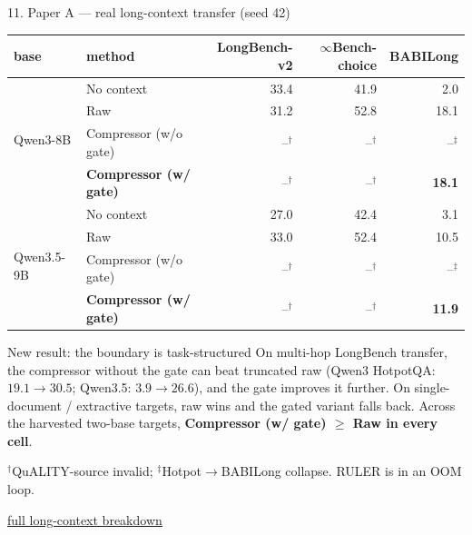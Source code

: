 \documentclass[aspectratio=169]{beamer}
\newcommand{\ghbase}{https://github.com/BDeMo/research-notes/blob/main/notes/plans/08-compressed-context-memory}
\newcommand{\ghA}[2]{\href{\ghbase/papers/paper-a-latent-memory/#1}{\color{blue}\underline{#2}}}
\newcommand{\best}[1]{\textbf{#1}}
\newcommand{\refm}[1]{\textcolor{black!55}{#1}}
\begin{document}
\begin{frame}{11. Paper A --- real long-context transfer (seed 42)}
  \centering\scriptsize
  \begin{tabular}{llrrr}
  \toprule
  base & method & LongBench-v2 & $\infty$Bench-choice & BABILong \\
  \midrule
  \multirow{4}{*}{Qwen3-8B}
    & \refm{No context} & 33.4 & 41.9 & 2.0 \\
    & \refm{Raw} & 31.2 & 52.8 & 18.1 \\
    & Compressor (w/o gate) & --$^\dagger$ & --$^\dagger$ & --$^\ddagger$ \\
    & \best{Compressor (w/ gate)} & --$^\dagger$ & --$^\dagger$ & \best{18.1} \\
  \midrule
  \multirow{4}{*}{Qwen3.5-9B}
    & \refm{No context} & 27.0 & 42.4 & 3.1 \\
    & \refm{Raw} & 33.0 & 52.4 & 10.5 \\
    & Compressor (w/o gate) & --$^\dagger$ & --$^\dagger$ & --$^\ddagger$ \\
    & \best{Compressor (w/ gate)} & --$^\dagger$ & --$^\dagger$ & \best{11.9} \\
  \bottomrule
  \end{tabular}
  \vspace{0.35em}
  \begin{block}{New result: the boundary is task-structured}
    \footnotesize On multi-hop LongBench transfer, the compressor without the gate can beat truncated raw
    (Qwen3 HotpotQA: $19.1\to30.5$; Qwen3.5: $3.9\to26.6$), and the gate improves it further.
    On single-document / extractive targets, raw wins and the gated variant falls back. Across the harvested
    two-base targets, \best{Compressor (w/ gate) $\ge$ Raw in every cell}.
  \end{block}
  \footnotesize $^\dagger$QuALITY-source invalid; $^\ddagger$Hotpot$\to$BABILong collapse. RULER is in an OOM loop.
  \begin{block}{}\footnotesize \ghA{paper-a-all-benchmarks-skeleton-2026-07-21.md}{full long-context breakdown}\end{block}
\end{frame}
\end{document}
